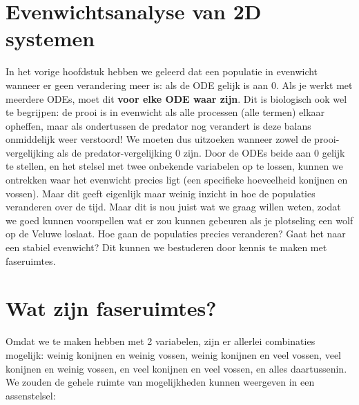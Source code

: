 \documentclass[
  a4paper,
]{scrbook}
\theoremstyle{definition}
\theoremstyle{remark}
\begin{document}
\hypertarget{evenwichtsanalyse-van-2d-systemen}{%
\section{Evenwichtsanalyse van 2D
systemen}\label{evenwichtsanalyse-van-2d-systemen}}

In het vorige hoofdstuk hebben we geleerd dat een populatie in evenwicht
wanneer er geen verandering meer is: als de ODE gelijk is aan \(0\). Als
je werkt met meerdere ODEs, moet dit \textbf{voor elke ODE waar zijn}.
Dit is biologisch ook wel te begrijpen: de prooi is in evenwicht als
alle processen (alle termen) elkaar opheffen, maar als ondertussen de
predator nog verandert is deze balans onmiddelijk weer verstoord! We
moeten dus uitzoeken wanneer zowel de prooi-vergelijking als de
predator-vergelijking \(0\) zijn. Door de ODEs beide aan 0 gelijk te
stellen, en het stelsel met twee onbekende variabelen op te lossen,
kunnen we ontrekken waar het evenwicht precies ligt (een specifieke
hoeveelheid konijnen en vossen). Maar dit geeft eigenlijk maar weinig
inzicht in hoe de populaties veranderen over de tijd. Maar dit is nou
juist wat we graag willen weten, zodat we goed kunnen voorspellen wat er
zou kunnen gebeuren als je plotseling een wolf op de Veluwe loslaat. Hoe
gaan de populaties precies veranderen? Gaat het naar een stabiel
evenwicht? Dit kunnen we bestuderen door kennis te maken met
faseruimtes.

\hypertarget{wat-zijn-faseruimtes}{%
\section{Wat zijn faseruimtes?}\label{wat-zijn-faseruimtes}}

Omdat we te maken hebben met 2 variabelen, zijn er allerlei combinaties
mogelijk: weinig konijnen en weinig vossen, weinig konijnen en veel
vossen, veel konijnen en weinig vossen, en veel konijnen en veel vossen,
en alles daartussenin. We zouden de gehele ruimte van mogelijkheden
kunnen weergeven in een assenstelsel:
\end{document}
